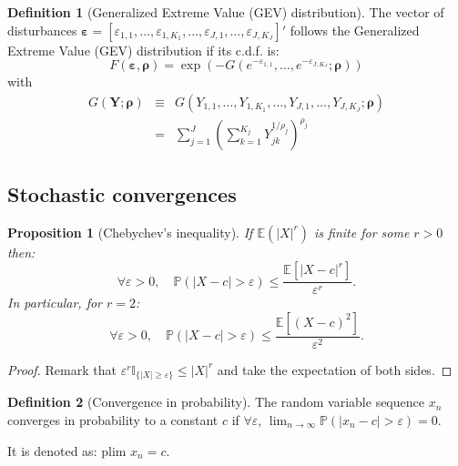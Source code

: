 \documentclass[
  12pt,
]{book}
\newtheorem{proposition}{Proposition}[chapter]
\theoremstyle{definition}
\newtheorem{definition}{Definition}[chapter]
\theoremstyle{definition}
\theoremstyle{definition}
\theoremstyle{definition}
\theoremstyle{remark}
\begin{document}
\begin{definition}[Generalized Extreme Value (GEV) distribution]
\protect\hypertarget{def:GEVdistri}{}\label{def:GEVdistri}The vector of disturbances \(\boldsymbol\varepsilon=[\varepsilon_{1,1},\dots,\varepsilon_{1,K_1},\dots,\varepsilon_{J,1},\dots,\varepsilon_{J,K_J}]'\) follows the Generalized Extreme Value (GEV) distribution if its c.d.f. is:
\[
F(\boldsymbol\varepsilon,\boldsymbol\rho) = \exp(-G(e^{-\varepsilon_{1,1}},\dots,e^{-\varepsilon_{J,K_J}};\boldsymbol\rho))
\]
with
\begin{eqnarray*}
G(\mathbf{Y};\boldsymbol\rho) &\equiv&  G(Y_{1,1},\dots,Y_{1,K_1},\dots,Y_{J,1},\dots,Y_{J,K_J};\boldsymbol\rho) \\
&=& \sum_{j=1}^J\left(\sum_{k=1}^{K_j} Y_{jk}^{1/\rho_j}
\right)^{\rho_j}
\end{eqnarray*}
\end{definition}

\hypertarget{StochConvergences}{%
\subsection{Stochastic convergences}\label{StochConvergences}}

\begin{proposition}[Chebychev's inequality]
\protect\hypertarget{prp:chebychev}{}\label{prp:chebychev}If \(\mathbb{E}(|X|^r)\) is finite for some \(r>0\) then:
\[
\forall \varepsilon > 0, \quad \mathbb{P}(|X - c|>\varepsilon) \le \frac{\mathbb{E}[|X - c|^r]}{\varepsilon^r}.
\]
In particular, for \(r=2\):
\[
\forall \varepsilon > 0, \quad \mathbb{P}(|X - c|>\varepsilon) \le \frac{\mathbb{E}[(X - c)^2]}{\varepsilon^2}.
\]
\end{proposition}

\begin{proof}
Remark that \(\varepsilon^r \mathbb{I}_{\{|X| \ge \varepsilon\}} \le |X|^r\) and take the expectation of both sides.
\end{proof}

\begin{definition}[Convergence in probability]
\protect\hypertarget{def:convergenceproba}{}\label{def:convergenceproba}The random variable sequence \(x_n\) converges in probability to a constant \(c\) if \(\forall \varepsilon\), \(\lim_{n \rightarrow \infty} \mathbb{P}(|x_n - c|>\varepsilon) = 0\).

It is denoted as: \(\mbox{plim } x_n = c\).
\end{definition}
\end{document}
